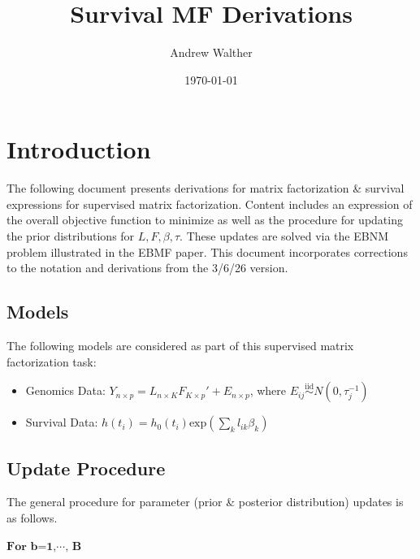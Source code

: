 \documentclass{article}[12pt]
\begin{document}
\title{Survival MF Derivations}
\author{Andrew Walther}
\date{\today}
\maketitle
\tableofcontents
\newpage

\section{Introduction}

The following document presents derivations for matrix factorization \& survival
expressions for supervised matrix factorization. Content includes an expression
of the overall objective function to minimize as well as the procedure for
updating the prior distributions for $L, F, \beta, \tau$. These updates are
solved via the EBNM problem illustrated in the EBMF paper. This document
incorporates corrections to the notation and derivations from the
3/6/26 version.

\subsection{Models}

The following models are considered as part of this supervised matrix
factorization task:

\begin{itemize}
    \item Genomics Data: $Y_{n \times p} = L_{n\times K}F_{K\times p}' + E_{n\times p}$, where $E_{ij} \overset{\mathrm{iid}}{\sim} N\left(0, \tau_{j}^{-1}\right)$

    \item Survival Data: $h(t_i) = h_0(t_i)\text{exp}\left(\sum_k l_{ik}\beta_{k}\right)$
\end{itemize}

\subsection{Update Procedure}

The general procedure for parameter (prior \& posterior distribution) updates is as follows.

$\textbf{For b=1,$\cdots$, B}$
\end{document}
